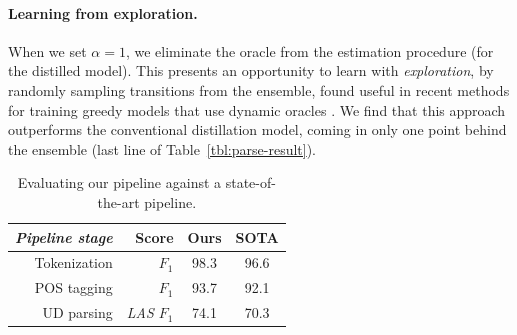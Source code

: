 \documentclass[11pt,a4paper]{article}
\newcommand{\nascomment}[1]{\textcolor{blue}{[#1 ---\textsc{nas}]}}
\begin{document}
\paragraph{Learning from exploration.} When we set $\alpha =1$, we
eliminate the oracle from the estimation procedure (for the distilled
model).  This presents an opportunity to learn with \emph{exploration}, by
randomly sampling transitions from the ensemble, found useful
in recent methods for training greedy models that use dynamic oracles
\citep{ballesteros-EtAl:2016:EMNLP2016}.  
We find that this
approach outperforms the  conventional distillation model, coming in
only one point behind the ensemble (last line of Table~\ref{tbl:parse-result}).

%




\begin{table}[t]
	\centering
	\begin{tabular}{rrcc}
		\hline
		\it Pipeline stage & Score & Ours & SOTA \\
		\hline
		Tokenization  & \it $F_1$ & 98.3 & 96.6 \\		
		POS tagging &  \it  $F_1$ & 93.7 & 92.1 \\
		UD parsing & \it LAS $F_1$ & 74.1 & 70.3 \\
		\hline
	\end{tabular}
	\caption{Evaluating our pipeline against a state-of-the-art pipeline. \label{tbl:pipline} }
\end{table}
\end{document}
